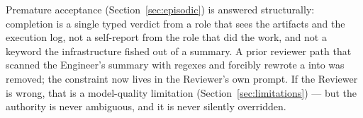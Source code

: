 \begin{callout}
Premature acceptance (Section~\ref{sec:episodic}) is answered structurally:
completion is a single typed verdict from a role that sees the artifacts and the
execution log, not a self-report from the role that did the work, and not a keyword
the infrastructure fished out of a summary. A prior reviewer path that scanned the
Engineer's summary with regexes and forcibly rewrote a  into
 was removed; the constraint now lives in the Reviewer's own prompt.
If the Reviewer is wrong, that is a model-quality limitation
(Section~\ref{sec:limitations}) --- but the authority is never ambiguous, and it is
never silently overridden.
\end{callout}
